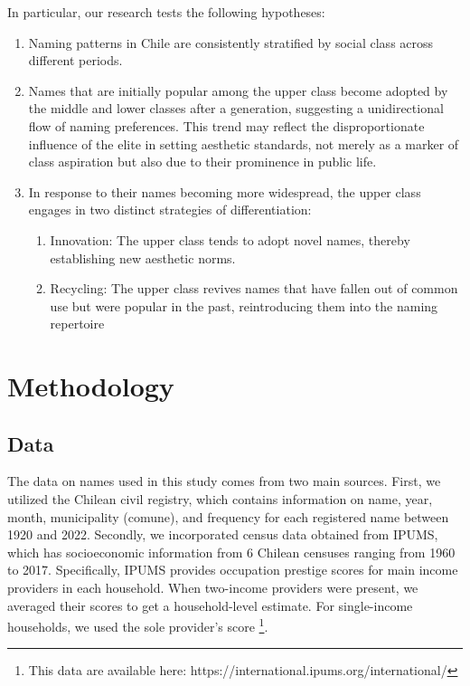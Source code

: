 In particular, our research tests the following hypotheses:

 
\begin{enumerate}
    \item Naming patterns in Chile are consistently stratified by social class across different periods.
    \item Names that are initially popular among the upper class become adopted by the middle and lower classes after a generation, suggesting a unidirectional flow of naming preferences. This trend may reflect the disproportionate influence of the elite in setting aesthetic standards, not merely as a marker of class aspiration but also due to their prominence in public life.
    \item In response to their names becoming more widespread, the upper class engages in two distinct strategies of differentiation: 
    
    \begin{enumerate}
       \item Innovation: The upper class tends to adopt novel names, thereby establishing new aesthetic norms.
       \item Recycling: The upper class revives names that have fallen out of common use but were popular in the past, reintroducing them into the naming repertoire
    \end{enumerate}

\end{enumerate}

\section{Methodology}

\subsection{Data}
The data on names used in this study comes from two main sources. First, we utilized the Chilean civil registry, which contains information on name, year, month, municipality (comune), and frequency for each registered name between 1920 and 2022. Secondly, we incorporated census data obtained from IPUMS, which has socioeconomic information from 6 Chilean censuses ranging from 1960 to 2017. Specifically, IPUMS provides occupation prestige scores for main income providers in each household. When two-income providers were present, we averaged their scores to get a household-level estimate. For single-income households, we used the sole provider's score \footnote{This data are available here: https://international.ipums.org/international/}.

